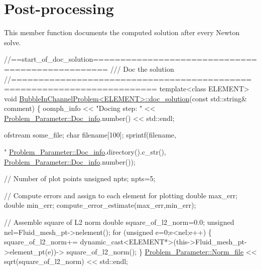  

\hypertarget{index_doc}{}\section{Post-\/processing}\label{index_doc}
This member function documents the computed solution after every Newton solve.


\begin{DoxyCodeInclude}
\textcolor{comment}{//==start\_of\_doc\_solution=================================================}
\textcolor{comment}{/// Doc the solution}
\textcolor{comment}{}\textcolor{comment}{//========================================================================}
\textcolor{keyword}{template}<\textcolor{keyword}{class} ELEMENT>
\textcolor{keywordtype}{void} \hyperlink{classBubbleInChannelProblem_a6a68ee06024107d7b3f92059365a06d1}{BubbleInChannelProblem<ELEMENT>::doc\_solution}(\textcolor{keyword}{const} 
      std::string& comment)
\{ 
 oomph\_info << \textcolor{stringliteral}{"Docing step: "} << \hyperlink{namespaceProblem__Parameter_a1dd3c6bcf97360c8fe0d288ca7610351}{Problem\_Parameter::Doc\_info}.number()
            << std::endl;
 
 ofstream some\_file;
 \textcolor{keywordtype}{char} filename[100];
 sprintf(filename,\textcolor{stringliteral}{"%
         \hyperlink{namespaceProblem__Parameter_a1dd3c6bcf97360c8fe0d288ca7610351}{Problem\_Parameter::Doc\_info}.directory().c\_str(),
         \hyperlink{namespaceProblem__Parameter_a1dd3c6bcf97360c8fe0d288ca7610351}{Problem\_Parameter::Doc\_info}.number());

 \textcolor{comment}{// Number of plot points}
 \textcolor{keywordtype}{unsigned} npts;
 npts=5; 

 \textcolor{comment}{// Compute errors and assign to each element for plotting}
 \textcolor{keywordtype}{double} max\_err;
 \textcolor{keywordtype}{double} min\_err;
 compute\_error\_estimate(max\_err,min\_err);
 
 \textcolor{comment}{// Assemble square of L2 norm }
 \textcolor{keywordtype}{double} square\_of\_l2\_norm=0.0;
 \textcolor{keywordtype}{unsigned} nel=Fluid\_mesh\_pt->nelement();
 \textcolor{keywordflow}{for} (\textcolor{keywordtype}{unsigned} e=0;e<nel;e++)
  \{
   square\_of\_l2\_norm+=
    \textcolor{keyword}{dynamic\_cast<}ELEMENT*\textcolor{keyword}{>}(this->Fluid\_mesh\_pt->element\_pt(e))->
    square\_of\_l2\_norm();
  \}
 \hyperlink{namespaceProblem__Parameter_a388e06a5e637b21378ab1832e5564bec}{Problem\_Parameter::Norm\_file} << sqrt(square\_of\_l2\_norm) << std::endl;
 

}
\end{DoxyCodeInclude}
